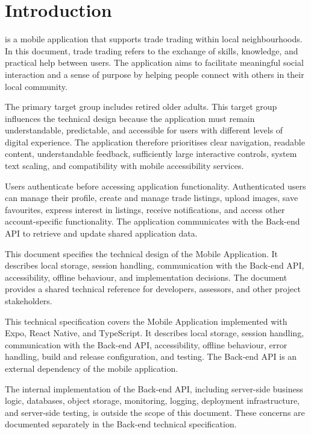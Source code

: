 \section{Introduction}
\label{sec:introduction}

\tradesq{} is a mobile application that supports trade trading within local neighbourhoods.
In this document, trade trading refers to the exchange of skills, knowledge, and practical help between users.
The application aims to facilitate meaningful social interaction and a sense of purpose by helping people connect with others in their local community.

The primary target group includes retired older adults.
This target group influences the technical design because the application must remain understandable, predictable, and accessible for users with different levels of digital experience.
The application therefore prioritises clear navigation, readable content, understandable feedback, sufficiently large interactive controls, system text scaling, and compatibility with mobile accessibility services.

Users authenticate before accessing application functionality.
Authenticated users can manage their profile, create and manage trade listings, upload images, save favourites, express interest in listings, receive notifications, and access other account-specific functionality.
The application communicates with the \tradesq{} Back-end API to retrieve and update shared application data.

This document specifies the technical design of the \tradesq{} Mobile Application.
It describes local storage, session handling, communication with the \tradesq{} Back-end API, accessibility, offline behaviour, and implementation decisions.
The document provides a shared technical reference for developers, assessors, and other project stakeholders.

This technical specification covers the \tradesq{} Mobile Application implemented with Expo, React Native, and TypeScript.
It describes local storage, session handling, communication with the \tradesq{} Back-end API, accessibility, offline behaviour, error handling, build and release configuration, and testing.
The \tradesq{} Back-end API is an external dependency of the mobile application.

The internal implementation of the Back-end API, including server-side business logic, databases, object storage, monitoring, logging, deployment infrastructure, and server-side testing, is outside the scope of this document.
These concerns are documented separately in the Back-end technical specification.
